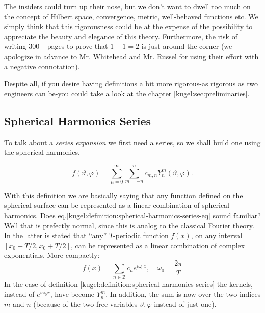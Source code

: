 The insiders could turn up their nose, but we don't want to dwell too much on the concept of Hilbert space, convergence, metric, well-behaved functions etc.
We simply think that this rigorousness could be at the expense of the possibility to appreciate the beauty and elegance of this theory. 
Furthermore, the risk of writing 300+ pages to prove that $1+1=2$ is just around the corner\cite{principia-mathematica} (we apologize in advance to Mr. Whitehead and Mr. Russel for using their effort with a negative connotation). 

Despite all, if you desire having definitions a bit more rigorous-as rigorous as two engineers can be-you could take a look at the chapter \ref{kugel:sec:preliminaries}.

\subsection{Spherical Harmonics Series}

To talk about a \emph{series expansion} we first need a series, so we shall
build one using the spherical harmonics.

\begin{definition}
  \label{kugel:def:spherical-harmonics-series}
  \begin{equation}
    f(\vartheta, \varphi) 
    = \sum_{n=0}^\infty \sum_{m =-n}^n
      c_{m,n} Y^m_n(\vartheta, \varphi). \label{kugel:definition:spherical-harmonics-series-eq}
  \end{equation}
\end{definition}

With this definition we are basically saying that any function defined on the spherical surface can be represented as a linear combination of spherical harmonics. 
Does eq.\eqref{kugel:definition:spherical-harmonics-series-eq} sound familiar? Well that is prefectly normal, since this is analog to the classical Fourier theory. 
In the latter is stated that ``any'' $T$-periodic function $f(x)$, on any interval $[x_0-T/2,x_0+T/2]$, can be represented as a linear combination of complex exponentials. More compactly:
\begin{equation*}
  f(x) = \sum_{n \in \mathbb{Z}} c_n e^{i \omega_0 x},
    \quad \omega_0=\frac{2\pi}{T}
\end{equation*}
In the case of definition \ref{kugel:definition:spherical-harmonics-series} the kernels, instead of $e^{i\omega_0x}$, have become $Y^m_n$. In addition, 
the sum is now over the two indices $m$ and $n$ (because of the two free variables $\vartheta, \varphi$ instead of just one).

